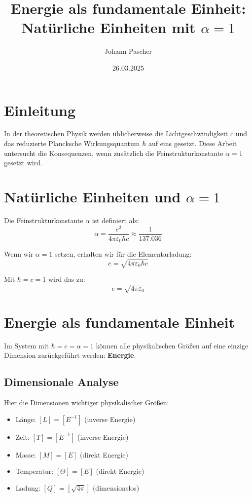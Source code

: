 \documentclass{article}
\title{Energie als fundamentale Einheit:\\
	Natürliche Einheiten mit $\alpha = 1$}
\author{Johann Pascher}
\date{26.03.2025}
\begin{document}
	
	\maketitle
	\tableofcontents
	\section{Einleitung}
	In der theoretischen Physik werden üblicherweise die Lichtgeschwindigkeit $c$ und das reduzierte Plancksche Wirkungsquantum $\hbar$ auf eins gesetzt. Diese Arbeit untersucht die Konsequenzen, wenn zusätzlich die Feinstrukturkonstante $\alpha=1$ gesetzt wird.
	
	\section{Natürliche Einheiten und $\alpha = 1$}
	
	Die Feinstrukturkonstante $\alpha$ ist definiert als:
	\begin{equation}
		\alpha = \frac{e^2}{4\pi\varepsilon_0 \hbar c} \approx \frac{1}{137.036}
	\end{equation}
	
	Wenn wir $\alpha = 1$ setzen, erhalten wir für die Elementarladung:
	\begin{equation}
		e = \sqrt{4\pi\varepsilon_0 \hbar c}
	\end{equation}
	
	Mit $\hbar = c = 1$ wird das zu:
	\begin{equation}
		e = \sqrt{4\pi\varepsilon_0}
	\end{equation}
	
	\section{Energie als fundamentale Einheit}
	
	Im System mit $\hbar = c = \alpha = 1$ können alle physikalischen Größen auf eine einzige Dimension zurückgeführt werden: \textbf{Energie}.
	
	\subsection{Dimensionale Analyse}
	
	Hier die Dimensionen wichtiger physikalischer Größen:
	
	\begin{itemize}
		\item Länge: $[L] = [E^{-1}]$ (inverse Energie)
		\item Zeit: $[T] = [E^{-1}]$ (inverse Energie)
		\item Masse: $[M] = [E]$ (direkt Energie)
		\item Temperatur: $[\Theta] = [E]$ (direkt Energie)
		\item Ladung: $[Q] = [\sqrt{4\pi}]$ (dimensionslos)
	\end{itemize}
	
\end{document}
